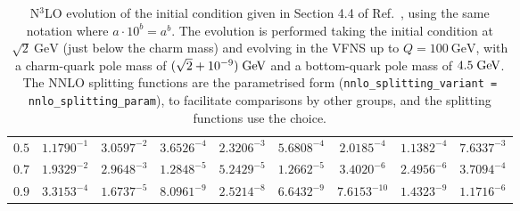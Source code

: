 \begin{table}[p]
\begin{tabular}{c|cccccccc}
$0.5$    &  $1.1790^{-1}$ &  $3.0597^{-2}$ &  $3.6526^{-4}$ &  $2.3206^{-3}$ &  $5.6808^{-4}$ &  $2.0185^{-4}$ &  $1.1382^{-4}$ &  $7.6337^{-3}$ \\
$0.7$    &  $1.9329^{-2}$ &  $2.9648^{-3}$ &  $1.2848^{-5}$ &  $5.2429^{-5}$ &  $1.2662^{-5}$ &  $3.4020^{-6}$ &  $2.4956^{-6}$ &  $3.7094^{-4}$ \\
$0.9$    &  $3.3153^{-4}$ &  $1.6737^{-5}$ &  $8.0961^{-9}$ &  $2.5214^{-8}$ &  $6.6432^{-9}$ &  $7.6153^{-10}$ &  $1.4323^{-9}$ &  $1.1716^{-6}$ 
  \end{tabular}
  \caption{N$^3$LO evolution of the initial condition given in Section
    4.4 of Ref.~\cite{Dittmar:2005ed}, using the same notation where
    $a\cdot10^{b} = a^b$. The evolution is performed taking the
    initial condition at $\sqrt{2}~\text{GeV}$ (just below the charm
    mass) and evolving in the VFNS up to $Q=100~\text{GeV}$, with a
    charm-quark pole mass of $(\sqrt{2}+10^{-9})\;\mathrm{GeV}$ and a bottom-quark
    pole mass of $4.5\;\mathrm{GeV}$.
    The NNLO splitting functions are the parametrised form
    (\texttt{nnlo\_splitting\_variant = nnlo\_splitting\_param}), to 
    facilitate comparisons by other groups, and the \ntlo splitting
    functions use the
     choice.}
  \label{tab:n3lo-evolve}
\end{table}

